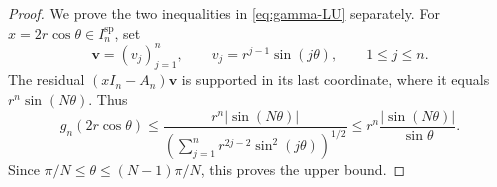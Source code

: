 \documentclass[10pt,twoside]{siamart1116}
\numberwithin{equation}{section}
\begin{document}

\begin{proof}
We prove the two inequalities in \eqref{eq:gamma-LU} separately.
For \(x=2r\cos\theta\in I_n^{\mathrm{sp}}\), set
\[
 \boldsymbol v=(v_j)_{j=1}^n,\qquad
 v_j=r^{j-1}\sin(j\theta),\qquad1\leq j\leq n.
\]
The residual \((xI_n-A_n)\boldsymbol v\) is supported in its last
coordinate, where it equals \(r^n\sin(N\theta)\).  Thus
\[
 g_n(2r\cos\theta)
 \leq\frac{r^n|\sin(N\theta)|}
 {\left(\sum_{j=1}^nr^{2j-2}\sin^2(j\theta)\right)^{1/2}}
 \leq r^n\frac{|\sin(N\theta)|}{\sin\theta}.
\]
Since \(\pi/N\leq\theta\leq(N-1)\pi/N\), this proves the upper bound.


\end{proof}
\end{document}
